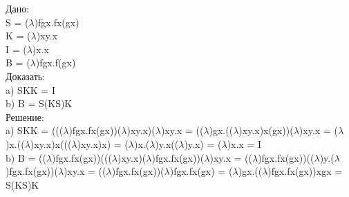 \documentclass[a4paper,portrait,12pt]{article}
\begin{document}
\begin{flushleft}
Дано:\\
S = ($\lambda$)fgx.fx(gx)\\
K = ($\lambda$)xy.x\\
I = ($\lambda$)x.x\\
B = ($\lambda$)fgx.f(gx)\\
Доказать:\\
a) SKK = I\\
b) B = S(KS)K\\
Решение:\\
a) SKK = ((($\lambda$)fgx.fx(gx))($\lambda$)xy.x)($\lambda$)xy.x = 
(($\lambda$)gx.(($\lambda$)xy.x)x(gx))($\lambda$)xy.x = 
($\lambda$)x.(($\lambda$)xy.x)x((($\lambda$)xy.x)x) = 
($\lambda$)x.($\lambda$)y.x(($\lambda$)y.x) =
($\lambda$)x.x = I\\
b) B = (($\lambda$)fgx.fx(gx))((($\lambda$)xy.x)($\lambda$)fgx.fx(gx))($\lambda$)xy.x = (($\lambda$)fgx.fx(gx))(($\lambda$)y.($\lambda$)fgx.fx(gx))($\lambda$)xy.x = (($\lambda$)fgx.fx(gx))($\lambda$)fgx.fx(gx) = ($\lambda$)gx.(($\lambda$)fgx.fx(gx))xgx = S(KS)K
\end{flushleft}

\newpage
\end{document}
